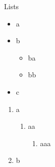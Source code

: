\documentclass[aspectratio=169]{beamer}
\begin{document}
\begin{frame}{Lists}

  \begin{itemize}
    \item a
    \item b
      \begin{itemize}
        \item ba
        \item bb
      \end{itemize}
    \item c
  \end{itemize}

  \begin{enumerate}
    \item a
      \begin{enumerate}
        \item aa
          \begin{enumerate}
            \item aaa
          \end{enumerate}
      \end{enumerate}
    \item b
  \end{enumerate}
\end{frame}
\end{document}
